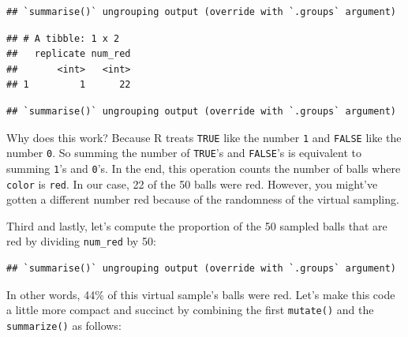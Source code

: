 \documentclass[
]{book}
\newenvironment{Shaded}{\begin{snugshade}}{\end{snugshade}}
\newcommand{\DataTypeTok}[1]{\textcolor[rgb]{0.13,0.29,0.53}{#1}}
\newcommand{\DecValTok}[1]{\textcolor[rgb]{0.00,0.00,0.81}{#1}}
\newcommand{\KeywordTok}[1]{\textcolor[rgb]{0.13,0.29,0.53}{\textbf{#1}}}
\newcommand{\NormalTok}[1]{#1}
\newcommand{\OperatorTok}[1]{\textcolor[rgb]{0.81,0.36,0.00}{\textbf{#1}}}
\newcommand{\StringTok}[1]{\textcolor[rgb]{0.31,0.60,0.02}{#1}}
\begin{document}
\begin{verbatim}
## `summarise()` ungrouping output (override with `.groups` argument)
\end{verbatim}

\begin{verbatim}
## # A tibble: 1 x 2
##   replicate num_red
##       <int>   <int>
## 1         1      22
\end{verbatim}

\begin{verbatim}
## `summarise()` ungrouping output (override with `.groups` argument)
\end{verbatim}

Why does this work? Because R treats \texttt{TRUE} like the number \texttt{1} and \texttt{FALSE} like the number \texttt{0}. So summing the number of \texttt{TRUE}'s and \texttt{FALSE}'s is equivalent to summing \texttt{1}'s and \texttt{0}'s. In the end, this operation counts the number of balls where \texttt{color} is \texttt{red}. In our case, 22 of the 50 balls were red. However, you might've gotten a different number red because of the randomness of the virtual sampling.

Third and lastly, let's compute the proportion of the 50 sampled balls that are red by dividing \texttt{num\_red} by 50:

\begin{Shaded}
\end{Shaded}

\begin{verbatim}
## `summarise()` ungrouping output (override with `.groups` argument)
\end{verbatim}

In other words, 44\% of this virtual sample's balls were red. Let's make this code a little more compact and succinct by combining the first \texttt{mutate()} and the \texttt{summarize()} as follows:
\end{document}
